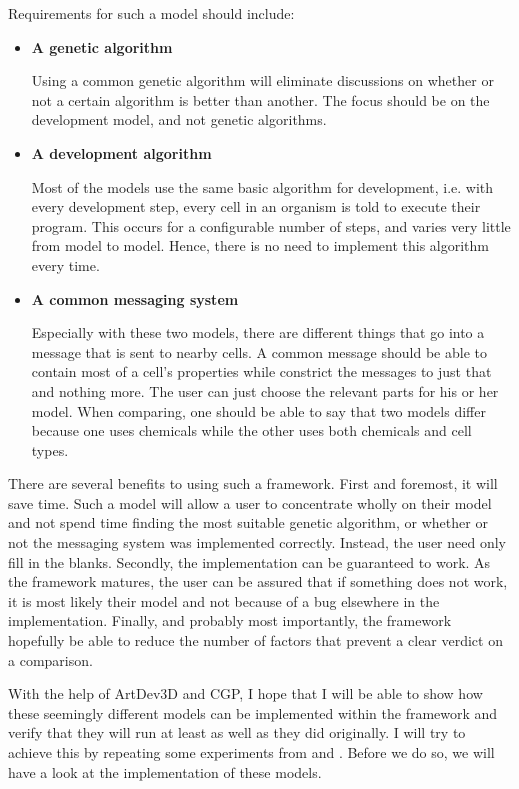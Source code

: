 Requirements for such a model should include:
\begin{itemize}
	\item\textbf{A genetic algorithm}

	Using a common genetic algorithm will eliminate discussions on whether or not a certain algorithm is better than another. The focus should be on the development model, and not genetic algorithms.

	\item\textbf{A development algorithm}

	Most of the models use the same basic algorithm for development, i.e. with every development step, every cell in an organism is told to execute their program. This occurs for a configurable number of steps, and varies very little from model to model. Hence, there is no need to implement this algorithm every time.

	\item\textbf{A common messaging system}

	Especially with these two models, there are different things that go into a message that is sent to nearby cells. A common message should be able to contain most of a cell's properties while constrict the messages to just that and nothing more. The user can just choose the relevant parts for his or her model. When comparing, one should be able to say that two models differ because one uses chemicals while the other uses both chemicals and cell types.
\end{itemize}

There are several benefits to using such a framework. First and foremost, it will save time. Such a model will allow a user to concentrate wholly on their model and not spend time finding the most suitable genetic algorithm, or whether or not the messaging system was implemented correctly. Instead, the user need only fill in the blanks. Secondly, the implementation can be guaranteed to work. As the framework matures, the user can be assured that if something does not work, it is most likely their model and not because of a bug elsewhere in the implementation. Finally, and probably most importantly, the framework hopefully be able to reduce the number of factors that prevent a clear verdict on a comparison.

With the help of ArtDev3D and CGP, I hope that I will be able to show how these seemingly different models can be implemented within the framework and verify that they will run at least as well as they did originally. I will try to achieve this by repeating some experiments from \cite{hoye2006} and \cite{ecal2003}. Before we do so, we will have a look at the implementation of these models.
